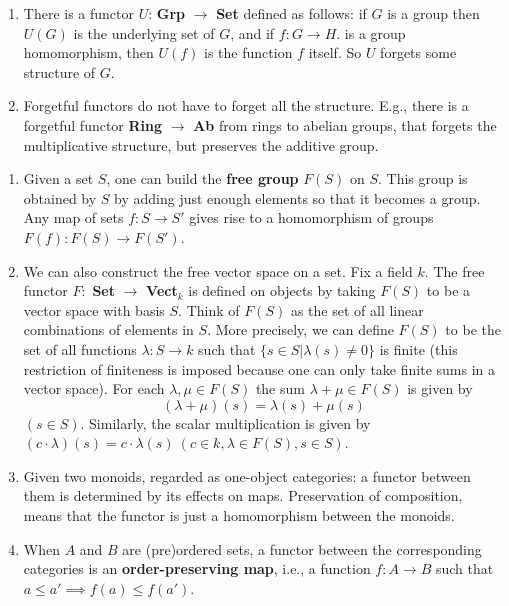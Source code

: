\begin{example}\leavevmode
    \begin{enumerate}[label=(\alph*)]
        \item There is a functor $U$: \textbf{Grp} $\to$ \textbf{Set} defined as follows: if $G$ is a group then $U(G)$ is the underlying set of $G$, and if $f:G\to H$. is a group homomorphism, then $U(f)$ is the function $f$ itself. So $U$ forgets some structure of $G$.
        \item Forgetful functors do not have to forget all the structure. E.g., there is a forgetful functor \textbf{Ring} $\to$ \textbf{Ab}  from rings to abelian groups, that forgets the multiplicative structure, but preserves the additive group.
    \end{enumerate}
\end{example}

\begin{example}\leavevmode
    \begin{enumerate}[label=(\alph*)]
        \item Given a set $S$, one can build the \textbf{free group} $F(S)$ on $S$. This group is obtained by $S$ by adding just enough elements so that it becomes a group.\\
            Any map of sets $f: S\to S'$ gives rise to a homomorphism of groups $F(f): F(S)\to F(S')$.
        \item We can also construct the free vector space on a set. Fix a field $k$. The free functor $F:$ \textbf{Set} $\to$ \textbf{Vect}$_k$ is defined on objects by taking $F(S)$ to be a vector space with basis $S$. Think of $F(S)$ as the set of all linear combinations of elements in $S$. More precisely, we can define $F(S)$ to be the set of all functions $\lambda: S\to k$ such that $\{s\in S | \lambda(s)\neq 0\}$ is finite (this restriction of finiteness is imposed because one can only take finite sums in a vector space). For each $\lambda, \mu \in F(S)$ the sum $\lambda + \mu \in F(S)$ is given by
            $$(\lambda + \mu)(s) = \lambda(s) + \mu(s)$$
            $(s \in S)$. Similarly, the scalar multiplication is given by $(c\cdot \lambda)(s) = c\cdot \lambda(s)\ (c\in k, \lambda\in F(S), s\in S)$.
        \item Given two monoids, regarded as one-object categories: a functor between them is determined by its effects on maps. Preservation of composition, means that the functor is just a homomorphism between the monoids. 
        \item When $A$ and $B$ are (pre)ordered sets, a functor between the corresponding categories is an \textbf{order-preserving map}, i.e., a function $f: A\to B$ such that $a\leq a' \implies f(a) \leq f(a')$.
    \end{enumerate}
\end{example}

